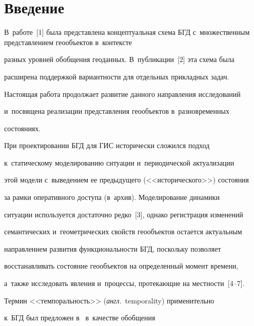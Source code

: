\section{Введение}





\vspace*{-4pt}





     


В~работе~[1] была представлена концептуальная схема БГД с~множественным пред\-став\-ле\-ни\-ем геообъектов в~контексте 


разных уровней обоб\-ще\-ния геоданных. В~пуб\-ли\-ка\-ции~[2] эта схема была 


расширена поддержкой ва\-ри\-ант\-ности для отдельных при\-клад\-ных задач. 


На\-сто\-ящая работа продолжает развитие данного на\-прав\-ле\-ния исследований 


и~посвящена реализации пред\-став\-ле\-ния геообъектов в~разновременных 


со\-сто\-я\-ниях. 


  


  При проектировании БГД для ГИС исторически сложился подход 


к~статическому моделированию ситуации и~периодической актуализации 


этой модели с~выведением ее предыду\-ще\-го (<<исторического>>) со\-сто\-яния 


за рамки оперативного доступа (в~архив). Моделирование динамики 


ситуации используется достаточно редко~[3], однако регистрация изменений 


семантических и~гео\-мет\-ри\-че\-ских свойств геообъектов остается актуальным 


на\-прав\-ле\-ни\-ем развития функ\-ци\-о\-нал\-ьности БГД, поскольку позволяет 


восстанавливать со\-сто\-яние геообъектов на определенный момент времени, 


а~также исследовать явления и~процессы, протекающие на местности~[4--7].


  


  Термин <<темпоральность>> (\textit{англ.}\ temporality) применительно 


к~БГД был предложен в~\cite{7-nik} в~качестве обобщения 


